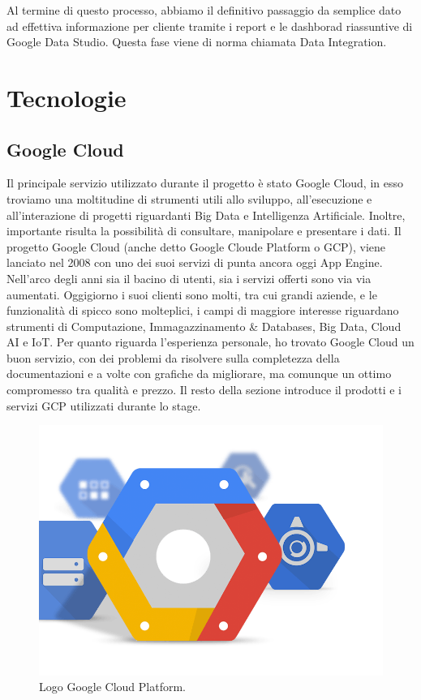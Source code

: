 Al termine di questo processo, abbiamo il definitivo passaggio da semplice dato ad effettiva informazione per cliente tramite i report e le dashborad riassuntive di Google Data Studio. Questa fase viene di norma chiamata Data Integration.

\section{Tecnologie}
\subsection{Google Cloud}
Il principale servizio utilizzato durante il progetto è stato Google Cloud, in esso troviamo una moltitudine di strumenti utili allo sviluppo, all'esecuzione e all'interazione di progetti riguardanti Big Data e Intelligenza Artificiale. Inoltre, importante risulta la possibilità di consultare, manipolare e presentare i dati.
Il progetto Google Cloud (anche detto Google Cloude Platform o GCP), viene lanciato nel 2008 con uno dei suoi servizi di punta ancora oggi  \gls{App Engine}. Nell'arco degli anni sia il bacino di utenti, sia i servizi offerti sono via via aumentati. Oggigiorno i suoi clienti \cite{clienti} sono molti, tra cui grandi aziende, e le funzionalità di spicco sono molteplici, i campi di maggiore interesse riguardano strumenti di Computazione, Immagazzinamento \& Databases, Big Data, Cloud AI e IoT.
Per quanto riguarda l'esperienza personale, ho trovato Google Cloud un buon servizio, con dei problemi da risolvere sulla completezza della documentazioni e a volte con grafiche da migliorare, ma comunque un ottimo compromesso tra qualità e prezzo.
Il resto della sezione introduce il prodotti e i servizi GCP utilizzati durante lo stage.
\begin{figure}
	\centering
	\includegraphics[scale=0.3]{figures/google-cloud-platform}
	\caption[Logo Google Cloud Platform.]{Logo Google Cloud Platform.
		\label{fig:logoGCP}}
\end{figure}	
